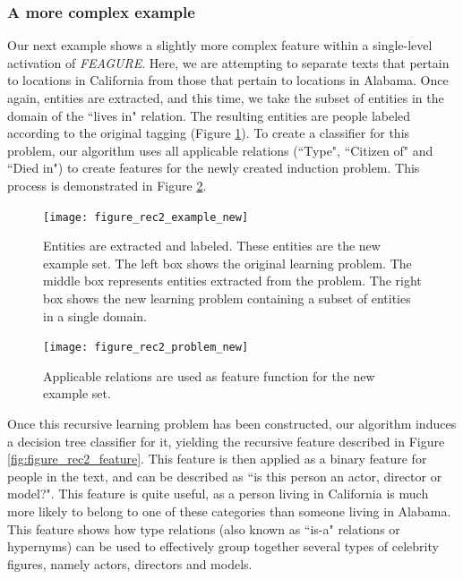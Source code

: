 \documentclass[twoside,11pt]{article}
\theoremstyle{definition}
\begin{document}
\subsubsection{A more complex example}

Our next example shows a slightly more complex feature within a single-level activation of \emph{FEAGURE}. Here, we are attempting to separate texts that pertain to locations in California from those that pertain to locations in Alabama. 
Once again, entities are extracted, and this time, we take the subset of entities in the domain of the ``lives in" relation. The resulting entities are people labeled according to the original tagging (Figure \ref{fig:figure_rec2_example}).
To create a classifier for this problem, our algorithm uses all applicable relations (``Type", ``Citizen of" and ``Died in") to create features for the newly created induction problem. %
This process is demonstrated in Figure \ref{fig:figure_rec2_problem}.

\begin{figure}[!h]
	\centering
	\texttt{[image: figure\_rec2\_example\_new]}
	\caption{Entities are extracted and labeled. These entities are the new example set. The left box shows the original learning problem. The middle box represents entities extracted from the problem. The right box shows the new learning problem containing a subset of entities in a single domain.}
	\label{fig:figure_rec2_example}
\end{figure}

\begin{figure}[!h]
	\centering
	\texttt{[image: figure\_rec2\_problem\_new]}
	\caption{Applicable relations are used as feature function for the new example set.}
	\label{fig:figure_rec2_problem}
\end{figure}


Once this recursive learning problem has been constructed, our algorithm induces a decision tree classifier for it, yielding the recursive feature described in Figure \ref{fig:figure_rec2_feature}. This feature is then applied as a binary feature for people in the text, and can be described as ``is this person an actor, director or model?".
This feature is quite useful, as a person living in California is much more likely to belong to one of these categories than someone living in Alabama. This feature shows how type relations (also known as ``is-a" relations or hypernyms) can be used to effectively group together several types of celebrity figures, namely actors, directors and models.
\end{document}
